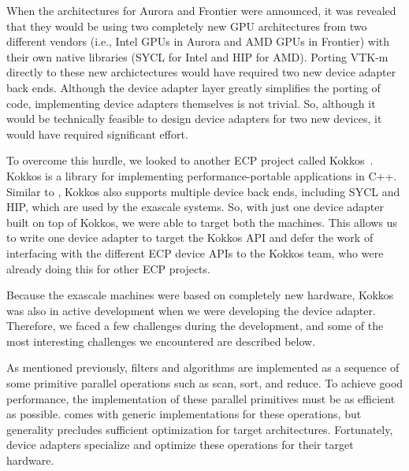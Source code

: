 When the architectures for Aurora and Frontier were announced, it was revealed that they would be using two completely new GPU architectures from two different vendors (i.e., Intel GPUs in Aurora and AMD GPUs in Frontier) with their own native libraries (SYCL for Intel and HIP for AMD).
Porting VTK-m directly to these new archictectures would have required two new device adapter back ends.
Although the device adapter layer greatly simplifies the porting of \vtkm code, implementing device adapters themselves is not trivial.
So, although it would be technically feasible to design device adapters for two new devices, it would have required significant effort.

To overcome this hurdle, we looked to another ECP project called Kokkos~\citep{Edwards2014, Trott2022}. Kokkos is a library for implementing performance-portable applications in C++. Similar to \vtkm, Kokkos also supports multiple device back ends, including SYCL and HIP, which are used by the exascale systems. So, with just one device adapter built on top of Kokkos, we were able to target both the machines.
This allows us to write one \vtkm device adapter to target the Kokkos API and defer the work of interfacing with the different ECP device APIs to the Kokkos team, who were already doing this for other ECP projects.

Because the exascale machines were based on completely new hardware, Kokkos was also in active development when we were developing the \vtkm device adapter. Therefore, we faced a few challenges during the development, and some of the most interesting challenges we encountered are described below.

As mentioned previously, \vtkm filters and algorithms are implemented as a sequence of some primitive parallel operations such as scan, sort, and reduce.
To achieve good performance, the implementation of these parallel primitives must be as efficient as possible.
\vtkm comes with generic implementations for these operations, but generality precludes sufficient optimization for target architectures.
Fortunately, device adapters specialize and optimize these operations for their target hardware.

